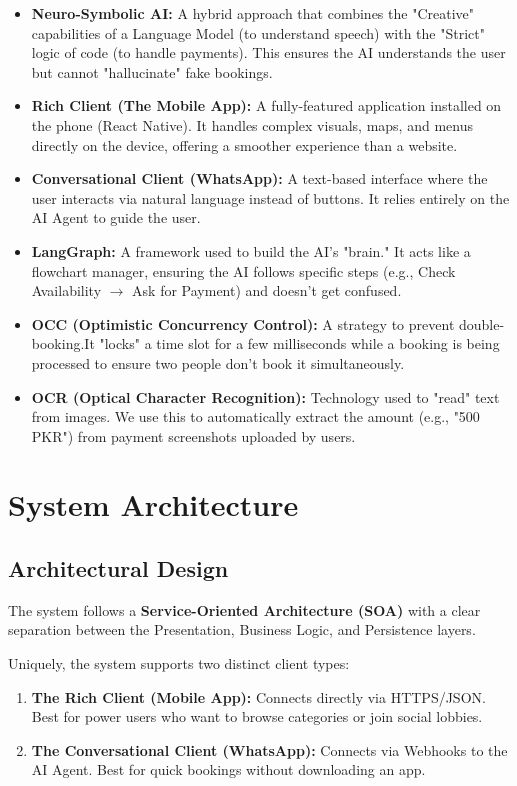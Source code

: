 \documentclass[12pt, a4paper]{article}
\begin{document}
\begin{itemize}
    \item \textbf{Neuro-Symbolic AI:} A hybrid approach that combines the "Creative" capabilities of a Language Model (to understand speech) with the "Strict" logic of code (to handle payments). This ensures the AI understands the user but cannot "hallucinate" fake bookings.
    \item \textbf{Rich Client (The Mobile App):} A fully-featured application installed on the phone (React Native). It handles complex visuals, maps, and menus directly on the device, offering a smoother experience than a website.
    \item \textbf{Conversational Client (WhatsApp):} A text-based interface where the user interacts via natural language instead of buttons. It relies entirely on the AI Agent to guide the user.
    \item \textbf{LangGraph:} A framework used to build the AI's "brain." It acts like a flowchart manager, ensuring the AI follows specific steps (e.g., Check Availability $\rightarrow$ Ask for Payment) and doesn't get confused.
    \item \textbf{OCC (Optimistic Concurrency Control):} A strategy to prevent double-booking.It "locks" a time slot for a few milliseconds while a booking is being processed to ensure two people don't book it simultaneously.
    \item \textbf{OCR (Optical Character Recognition):} Technology used to "read" text from images. We use this to automatically extract the amount (e.g., "500 PKR") from payment screenshots uploaded by users.
\end{itemize}


\section{System Architecture}

\subsection{Architectural Design}
The system follows a \textbf{Service-Oriented Architecture (SOA)} with a clear separation between the Presentation, Business Logic, and Persistence layers. 

Uniquely, the system supports two distinct client types:
\begin{enumerate}
    \item \textbf{The Rich Client (Mobile App):} Connects directly via HTTPS/JSON. Best for power users who want to browse categories or join social lobbies.
    \item \textbf{The Conversational Client (WhatsApp):} Connects via Webhooks to the AI Agent. Best for quick bookings without downloading an app.
\end{enumerate}
\end{document}
